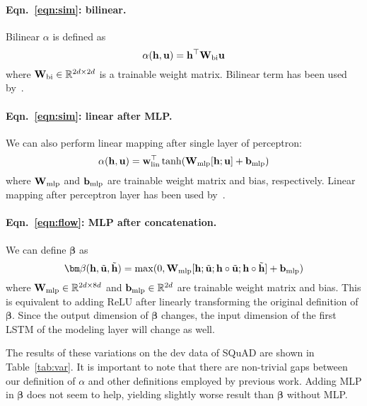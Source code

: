 \paragraph{Eqn.~\ref{eqn:sim}: bilinear.} 
Bilinear $\alpha$ is defined as
\begin{equation}
\alpha({\bf h}, {\bf u}) = {\bf h}^\top {\bf W}_\textup{bi} {\bf u}
\end{equation}
where ${\bf W}_\textup{bi} \in \mathbb{R}^{2d \times 2d}$ is a trainable weight matrix. 
Bilinear term has been used by~\cite{thorough}.

\paragraph{Eqn.~\ref{eqn:sim}: linear after MLP.} 
We can also perform linear mapping after single layer of perceptron:
\begin{equation}
\alpha({\bf h}, {\bf u}) = {\bf w}_\textup{lin}^\top \tanh({\bf W}_\textup{mlp} [{\bf h}; {\bf u}] + {\bf b}_\textup{mlp})
\end{equation}
where ${\bf W}_\textup{mlp}$ and ${\bf b}_\textup{mlp}$ are trainable weight matrix and bias, respectively.
Linear mapping after perceptron layer has been used by~\cite{Hermann2015TeachingMT}.

\paragraph{Eqn.~\ref{eqn:flow}: MLP after concatenation.}
We can define ${\bm \beta}$ as
\begin{equation}
{\bm \beta}({\bf h}, \tilde{\bf u}, \tilde{\bf h}) = \max(0, {\bf W}_\textup{mlp} [{\bf h}; \tilde{\bf u}; {\bf h} \circ \tilde{\bf u}; {\bf h} \circ \tilde{\bf h}] + {\bf b}_\textup{mlp})
\end{equation}
where ${\bf W}_\textup{mlp} \in \mathbb{R}^{2d \times 8d}$ and ${\bf b}_\textup{mlp} \in \mathbb{R}^{2d}$ are trainable weight matrix and bias.
This is equivalent to adding ReLU after linearly transforming the original definition of ${\bm \beta}$.
Since the output dimension of ${\bm \beta}$ changes, the input dimension of the first LSTM of the modeling layer will change as well.


The results of these variations on the dev data of SQuAD are shown in Table~\ref{tab:var}.
It is important to note that there are non-trivial gaps between our definition of $\alpha$ and other definitions employed by previous work.
Adding MLP in ${\bm \beta}$ does not seem to help, yielding slightly worse result than ${\bm \beta}$ without MLP.